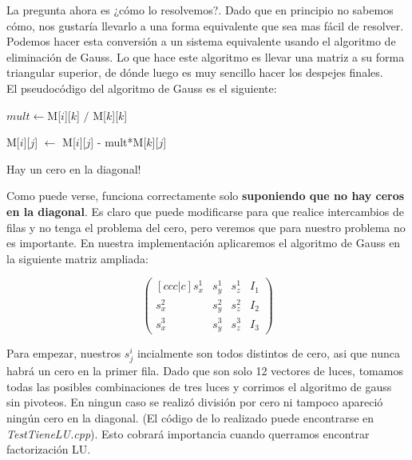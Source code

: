 La pregunta ahora es ¿cómo lo resolvemos?. Dado que en principio no sabemos cómo, nos gustaría llevarlo a una forma equivalente que sea mas fácil de resolver. Podemos hacer esta conversión a un sistema equivalente usando el algoritmo de eliminación de Gauss. Lo que hace este algoritmo es llevar una matriz a su forma triangular superior, de dónde luego es muy sencillo hacer los despejes finales. \\

El pseudocódigo del algoritmo de Gauss es el siguiente:

\begin{algorithm}[H]
\begin{algorithmic}


                \State $mult \gets $M[$i$][$k$] $/$ M[$k$][$k$]

                    \State M[$i$][$j$] $\gets$ M[$i$][$j$] - mult*M[$k$][$j$]

                \EndFor
            \Else
                \State Hay un cero en la diagonal!
            \EndIf
        \EndFor
    \EndFor

\EndFunction
\end{algorithmic}
\end{algorithm}

Como puede verse, funciona correctamente solo \textbf{suponiendo que no hay ceros en la diagonal}. Es claro que puede modificarse para que realice intercambios de filas y no tenga el problema del cero, pero veremos que para nuestro problema no es importante. En nuestra implementación aplicaremos el algoritmo de Gauss en la siguiente matriz ampliada:

\[
\begin{pmatrix}[ccc|c]
    s_{x}^{1} & s_{y}^{1} & s_{z}^{1} & I_{1} \\
    s_{x}^{2} & s_{y}^{2} & s_{z}^{2} & I_{2} \\
    s_{x}^{3} & s_{y}^{3} & s_{z}^{3} & I_{3}
\end{pmatrix}
\]

Para empezar, nuestros $s_{j}^{i}$ incialmente son todos distintos de cero, asi que nunca habrá un cero en la primer fila. Dado que son solo 12 vectores de luces, tomamos todas las posibles combinaciones de tres luces y corrimos el algoritmo de gauss sin pivoteos. En ningun caso se realizó división por cero ni tampoco apareció ningún cero en la diagonal. (El código de lo realizado puede encontrarse en \textit{TestTieneLU.cpp}). Esto cobrará importancia cuando querramos encontrar factorización LU. \\

